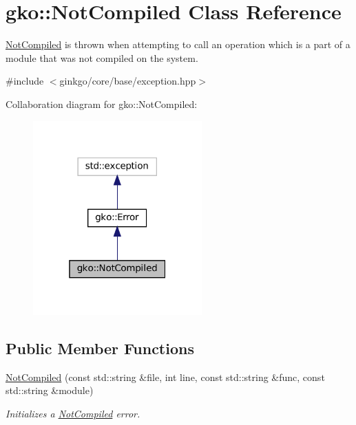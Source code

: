 \hypertarget{classgko_1_1NotCompiled}{}\section{gko\+:\+:Not\+Compiled Class Reference}
\label{classgko_1_1NotCompiled}


\hyperlink{classgko_1_1NotCompiled}{Not\+Compiled} is thrown when attempting to call an operation which is a part of a module that was not compiled on the system.  




{\ttfamily \#include $<$ginkgo/core/base/exception.\+hpp$>$}



Collaboration diagram for gko\+:\+:Not\+Compiled\+:
\nopagebreak
\begin{figure}[H]
\begin{center}
\leavevmode
\includegraphics[width=184pt]{classgko_1_1NotCompiled__coll__graph}
\end{center}
\end{figure}
\subsection*{Public Member Functions}
\begin{DoxyCompactItemize}
\item 
\hyperlink{classgko_1_1NotCompiled_aa85feba061f17a192a47f238a5bb4a32}{Not\+Compiled} (const std\+::string \&file, int line, const std\+::string \&func, const std\+::string \&module)
\begin{DoxyCompactList}\small\item\em Initializes a \hyperlink{classgko_1_1NotCompiled}{Not\+Compiled} error. \end{DoxyCompactList}\end{DoxyCompactItemize}


